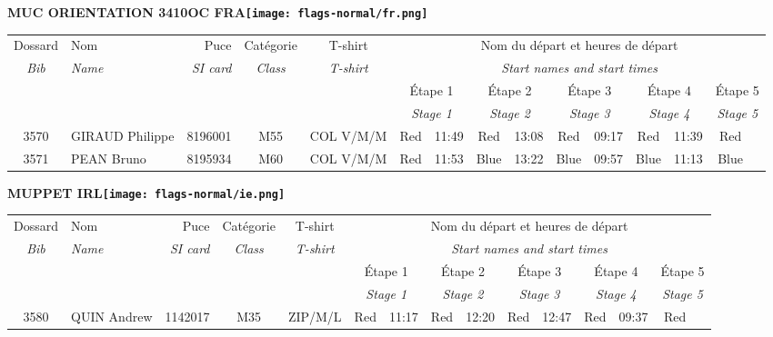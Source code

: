 \documentclass{report}
\begin{document}
\newpage
  \Huge \centering \bfseries MUC ORIENTATION 3410OC FRA\normalfont \footnotesize \sffamily \hfill \texttt{[image: flags-normal/fr.png]} \newline 
  \begin{longtable}{|c|l|r|c|c|*{5}{cc|}}
    Dossard & Nom  & Puce    & Catégorie & T-shirt & \multicolumn{10}{c|}{Nom du départ et heures de départ} \\
    \itshape Bib     & \itshape Name & \itshape SI card & \itshape Class  & \itshape  T-shirt  & \multicolumn{10}{c|}{\itshape Start names and start times} \\
    \hline
    & & & & & \multicolumn{2}{c|}{Étape 1} & \multicolumn{2}{c|}{Étape 2} & \multicolumn{2}{c|}{Étape 3} & \multicolumn{2}{c|}{Étape 4} & \multicolumn{2}{c|}{Étape 5} \\
    & & & & & \multicolumn{2}{c|}{\itshape Stage 1} & \multicolumn{2}{c|}{\itshape Stage 2} & \multicolumn{2}{c|}{\itshape Stage 3} & \multicolumn{2}{c|}{\itshape Stage 4} & \multicolumn{2}{c|}{\itshape Stage 5} \\
    \hline
    3570 & GIRAUD Philippe & 8196001 & M55 & COL V/M/M & Red & 11:49 & Red & 13:08 & Red & 09:17 & Red & 11:39 & Red &  \\
    3571 & PEAN Bruno & 8195934 & M60 & COL V/M/M & Red & 11:53 & Blue & 13:22 & Blue & 09:57 & Blue & 11:13 & Blue &  \\
  \end{longtable}
\newpage
  \Huge \centering \bfseries MUPPET  IRL\normalfont \footnotesize \sffamily \hfill \texttt{[image: flags-normal/ie.png]} \newline 
  \begin{longtable}{|c|l|r|c|c|*{5}{cc|}}
    Dossard & Nom  & Puce    & Catégorie & T-shirt & \multicolumn{10}{c|}{Nom du départ et heures de départ} \\
    \itshape Bib     & \itshape Name & \itshape SI card & \itshape Class  & \itshape  T-shirt  & \multicolumn{10}{c|}{\itshape Start names and start times} \\
    \hline
    & & & & & \multicolumn{2}{c|}{Étape 1} & \multicolumn{2}{c|}{Étape 2} & \multicolumn{2}{c|}{Étape 3} & \multicolumn{2}{c|}{Étape 4} & \multicolumn{2}{c|}{Étape 5} \\
    & & & & & \multicolumn{2}{c|}{\itshape Stage 1} & \multicolumn{2}{c|}{\itshape Stage 2} & \multicolumn{2}{c|}{\itshape Stage 3} & \multicolumn{2}{c|}{\itshape Stage 4} & \multicolumn{2}{c|}{\itshape Stage 5} \\
    \hline
    3580 & QUIN Andrew & 1142017 & M35 & ZIP/M/L & Red & 11:17 & Red & 12:20 & Red & 12:47 & Red & 09:37 & Red &  \\
  \end{longtable}
\end{document}
